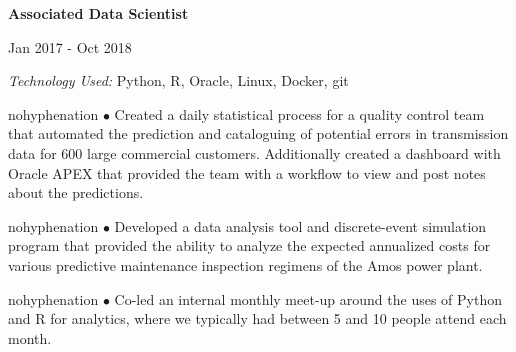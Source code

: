 \documentclass[12pt]{article}
\newcommand{\tab}[1][1cm]{\hspace*{#1}}
\newcommand{\position}[4]{
    \tab \textbf{#1} \hfill {\footnotesize #2 {-} #3 \par}
    \tab[1.25cm] \textit{Technology Used:} #4 \\
    \vspace*{0.5mm}
}
\newcommand{\bulletpoint}[1]{
  \begin{hyphenrules}{nohyphenation}
  	\hangindent=1.8cm \rightskip=2.5cm \tab[1.3cm] $\bullet$#1 \\
  \end{hyphenrules}
  \medskip
}
\begin{document}
\begin{flushleft}
    \position{Associated Data Scientist}{Jan 2017}{Oct 2018}{Python, R, Oracle, Linux, Docker, git}
    \bulletpoint{
    	Created a daily statistical process for a quality control team that automated the prediction
	and cataloguing of potential errors in transmission data for 600 large commercial customers.
	Additionally created a dashboard with Oracle APEX that provided the team with a workflow
	to view and post notes about the predictions.
    }
    \bulletpoint{
    	Developed a data analysis tool and discrete-event simulation program that provided the
	ability to analyze the expected annualized costs for various predictive maintenance
	inspection regimens of the Amos power plant.
    }
    \bulletpoint{
    	Co-led an internal monthly meet-up around the uses of Python and R for analytics,
	where we typically had between 5 and 10 people attend each month.
   }
    \medskip
  \end{flushleft}
  
\end{document}
